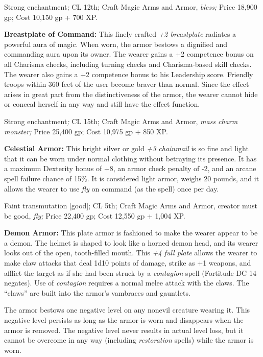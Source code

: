 Strong enchantment\textit{; }CL 12th; Craft Magic Arms and Armor, \textit{bless; 
}Price 18,900 gp; Cost 10,150 gp + 700 XP.

\textbf{Breastplate of Command: }This finely crafted \textit{+2 breastplate }radiates 
a powerful aura of magic. When worn, the armor bestows a dignified and commanding 
aura upon its owner. The wearer gains a +2 competence bonus on all Charisma checks, 
including turning checks and Charisma-based skill checks. The wearer also gains 
a +2 competence bonus to his Leadership score. Friendly troops within 360 feet 
of the user become braver than normal. Since the effect arises in great part from 
the distinctiveness of the armor, the wearer cannot hide or conceal herself in 
any way and still have the effect function.

Strong enchantment\textit{; }CL 15th; Craft Magic Arms and Armor, \textit{mass 
charm monster; }Price 25,400 gp; Cost 10,975 gp + 850 XP.

\textbf{Celestial Armor:} This bright silver or gold \textit{+3 chainmail }is so 
fine and light that it can be worn under normal clothing without betraying its 
presence. It has a maximum Dexterity bonus of +8, an armor check penalty of -2, 
and an arcane spell failure chance of 15\%. It is considered light armor, weighs 
20 pounds, and it allows the wearer to use \textit{fly }on command (as the spell) 
once per day.

Faint transmutation [good]; CL 5th; Craft Magic Arms and Armor, creator must be 
good, \textit{fly; }Price 22,400 gp; Cost 12,550 gp + 1,004 XP.

\textbf{Demon Armor: }This plate armor is fashioned to make the wearer appear to 
be a demon. The helmet is shaped to look like a horned demon head, and its wearer 
looks out of the open, tooth-filled mouth. This \textit{+4 full plate }allows the 
wearer to make claw attacks that deal 1d10 points of damage, strike as +1 weapons, 
and afflict the target as if she had been struck by a \textit{contagion }spell 
(Fortitude DC 14 negates). Use of \textit{contagion }requires a normal melee attack 
with the claws. The ``claws'' are built into the armor's vambraces and gauntlets. 

The armor bestows one negative level on any nonevil creature wearing it. This negative 
level persists as long as the armor is worn and disappears when the armor is removed. 
The negative level never results in actual level loss, but it cannot be overcome 
in any way (including \textit{restoration }spells) while the armor is worn.


